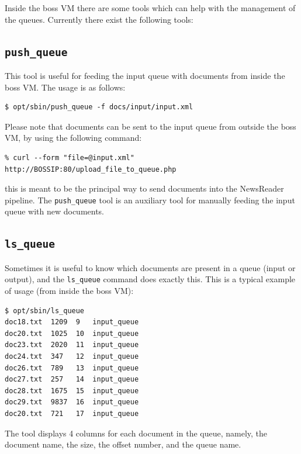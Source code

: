 \documentclass[a4]{article}
\newcommand{\todo}[1]{\textcolor{red}{\noindent$\rightarrow$ TODO: #1}}
\begin{document}
Inside the boss VM there are some tools which can help with the management
of the queues. Currently there exist the following tools:

\subsection*{\texttt{push\_queue}}
\label{sec:send-to-queue.pl}

This tool is useful for feeding the input queue with documents from inside
the \textrm{boss} VM. The usage is as follows:

\begin{verbatim}
$ opt/sbin/push_queue -f docs/input/input.xml
\end{verbatim}

Please note that documents can be sent to the input queue from outside the
\textrm{boss} VM, by using the following command:

\begin{verbatim}
% curl --form "file=@input.xml" http://BOSSIP:80/upload_file_to_queue.php
\end{verbatim}


\noindent this is meant to be the principal way to send documents into the
NewsReader pipeline. The \texttt{push\_queue} tool is an auxiliary tool
for manually feeding the input queue with new documents.

\subsection*{\texttt{ls\_queue}}
\label{sec:ls_queue}

Sometimes it is useful to know which documents are present in a queue (input
or output), and the \texttt{ls\_queue} command does exactly this. This is a
typical example of usage (from inside the \textrm{boss} VM):

\begin{verbatim}
$ opt/sbin/ls_queue
doc18.txt  1209  9   input_queue
doc20.txt  1025  10  input_queue
doc23.txt  2020  11  input_queue
doc24.txt  347   12  input_queue
doc26.txt  789   13  input_queue
doc27.txt  257   14  input_queue
doc28.txt  1675  15  input_queue
doc29.txt  9837  16  input_queue
doc20.txt  721   17  input_queue
\end{verbatim}

The tool displays 4 columns for each document in the queue, namely, the
document name, the size, the offset number, and the queue name.
\end{document}
